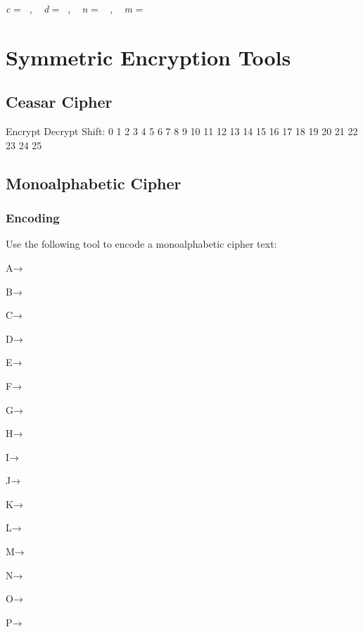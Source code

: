 \documentclass[
  letterpaper,
  DIV=11,
  numbers=noendperiod]{scrreprt}
\begin{document}
\emph{c} = ~, ~ \emph{d} = ~, ~ \emph{n} = ~ , ~ \emph{m} = ~

\hypertarget{symmetric-encryption-tools}{%
\section{Symmetric Encryption Tools}\label{symmetric-encryption-tools}}

\hypertarget{ceasar-cipher}{%
\subsection{Ceasar Cipher}\label{ceasar-cipher}}

Encrypt Decrypt Shift: 0 1 2 3 4 5 6 7 8 9 10 11 12 13 14 15 16 17 18 19
20 21 22 23 24 25

\hypertarget{monoalphabetic-cipher}{%
\subsection{Monoalphabetic Cipher}\label{monoalphabetic-cipher}}

\hypertarget{encoding}{%
\subsubsection{Encoding}\label{encoding}}

Use the following tool to encode a monoalphabetic cipher text:

\leavevmode{}%

\hypertarget{letters}{}
\hypertarget{a}{}
A→

\hypertarget{b}{}
B→

\hypertarget{c}{}
C→

\hypertarget{d}{}
D→

\hypertarget{e}{}
E→

\hypertarget{f}{}
F→

\hypertarget{g}{}
G→

\hypertarget{h}{}
H→

\hypertarget{i}{}
I→

\hypertarget{j}{}
J→

\hypertarget{k}{}
K→

\hypertarget{l}{}
L→

\hypertarget{m}{}
M→

\hypertarget{n}{}
N→

\hypertarget{o}{}
O→

\hypertarget{p}{}
P→
\end{document}
